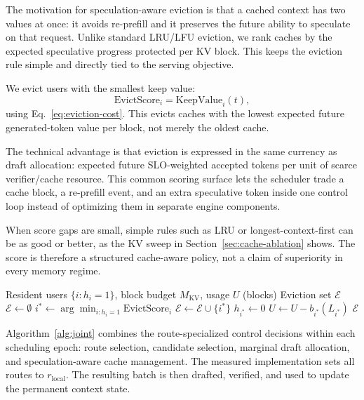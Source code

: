 \documentclass[journal]{IEEEtran}
\begin{document}
The motivation for speculation-aware eviction is that a cached context
has two values at once: it avoids re-prefill and it preserves the future
ability to speculate on that request. Unlike standard LRU/LFU eviction,
we rank caches by the expected speculative progress protected per KV
block. This keeps the eviction rule simple and directly tied to the
serving objective.

We evict users with the smallest keep value:
\begin{equation}
    \label{eq:eviction-score}
    \text{EvictScore}_i = 
    \text{KeepValue}_i(t),
\end{equation}
using Eq.~\eqref{eq:eviction-cost}. This evicts caches with the 
lowest expected future generated-token value per block, not merely the
oldest cache.

The technical advantage is that eviction is expressed in the same
currency as draft allocation: expected future SLO-weighted accepted
tokens per unit of scarce verifier/cache resource. This common scoring
surface lets the scheduler trade a cache block, a re-prefill event, and
an extra speculative token inside one control loop instead of optimizing
them in separate engine components.

When score gaps are small, simple rules such as LRU or
longest-context-first can be as good or better, as the KV sweep in
Section~\ref{sec:cache-ablation} shows. The score is therefore a
structured cache-aware policy, not a claim of superiority in every
memory regime.

\begin{algorithm}[t]
\caption{Speculation-Aware Cache Eviction}
\label{alg:eviction}
\begin{algorithmic}[1]
\REQUIRE Resident users $\{i : h_i = 1\}$, 
         block budget $M_{\text{KV}}$, usage $U$ (blocks)
\ENSURE Eviction set $\mathcal{E}$
\STATE $\mathcal{E} \leftarrow \emptyset$
    \STATE $i^* \leftarrow \arg\min_{i : h_i = 1} 
           \text{EvictScore}_i$
    \STATE $\mathcal{E} \leftarrow 
           \mathcal{E} \cup \{i^*\}$
    \STATE $h_{i^*} \leftarrow 0$
    \STATE $U \leftarrow U - b_{i^*}(L_{i^*})$
\ENDWHILE
\RETURN $\mathcal{E}$
\end{algorithmic}
\end{algorithm}

Algorithm~\ref{alg:joint} combines the route-specialized control
decisions within each scheduling epoch: route selection, candidate
selection, marginal draft allocation, and speculation-aware cache
management. The measured implementation sets all routes to
$r_{\mathrm{local}}$. The resulting batch is then drafted, verified,
and used to update the permanent context state.
\end{document}
